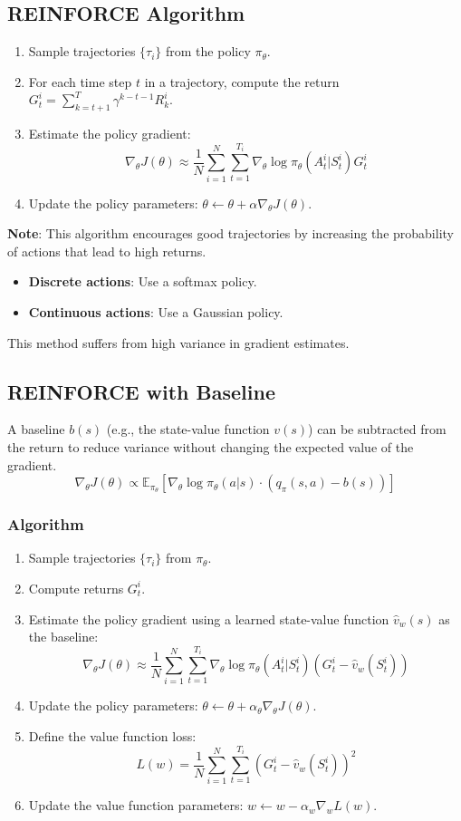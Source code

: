 \documentclass[12pt]{article}
\begin{document}
\subsection{REINFORCE Algorithm}
\begin{enumerate}
    \item Sample trajectories $\{\tau_i\}$ from the policy $\pi_\theta$.
    \item For each time step $t$ in a trajectory, compute the return $G_t^i = \sum_{k=t+1}^{T} \gamma^{k-t-1} R_k^i$.
    \item Estimate the policy gradient:
    $$ \nabla_\theta J(\theta) \approx \frac{1}{N} \sum_{i=1}^N \sum_{t=1}^{T_i} \nabla_\theta \log \pi_\theta(A_t^i | S_t^i) G_t^i $$
    \item Update the policy parameters: $\theta \leftarrow \theta + \alpha \nabla_\theta J(\theta)$.
\end{enumerate}
\textbf{Note}: This algorithm encourages good trajectories by increasing the probability of actions that lead to high returns.
\begin{itemize}
    \item \textbf{Discrete actions}: Use a softmax policy.
    \item \textbf{Continuous actions}: Use a Gaussian policy.
\end{itemize}
This method suffers from high variance in gradient estimates.

\subsection{REINFORCE with Baseline}
A baseline $b(s)$ (e.g., the state-value function $v(s)$) can be subtracted from the return to reduce variance without changing the expected value of the gradient.
$$ \nabla_\theta J(\theta) \propto \mathbb{E}_{\pi_\theta} \left[ \nabla_\theta \log \pi_\theta(a|s) \cdot (q_\pi(s,a) - b(s)) \right] $$

\subsubsection{Algorithm}
\begin{enumerate}
    \item Sample trajectories $\{\tau_i\}$ from $\pi_\theta$.
    \item Compute returns $G_t^i$.
    \item Estimate the policy gradient using a learned state-value function $\hat{v}_w(s)$ as the baseline:
    $$ \nabla_\theta J(\theta) \approx \frac{1}{N} \sum_{i=1}^N \sum_{t=1}^{T_i} \nabla_\theta \log \pi_\theta(A_t^i | S_t^i) (G_t^i - \hat{v}_w(S_t^i)) $$
    \item Update the policy parameters: $\theta \leftarrow \theta + \alpha_\theta \nabla_\theta J(\theta)$.
    \item Define the value function loss:
    $$ L(w) = \frac{1}{N} \sum_{i=1}^N \sum_{t=1}^{T_i} (G_t^i - \hat{v}_w(S_t^i))^2 $$
    \item Update the value function parameters: $w \leftarrow w - \alpha_w \nabla_w L(w)$.
\end{enumerate}
\end{document}
